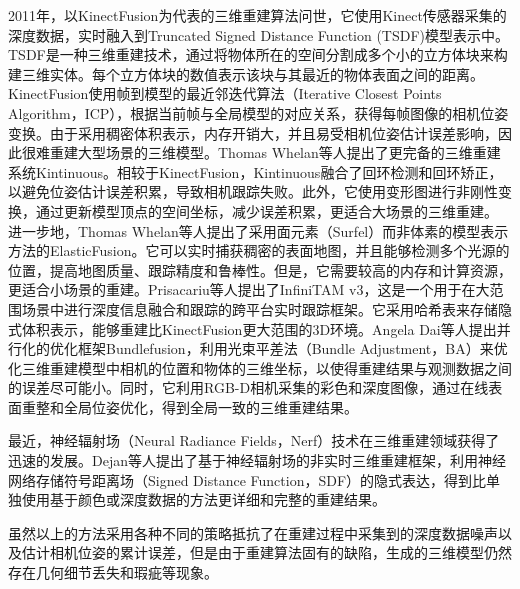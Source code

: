2011年，以KinectFusion为代表的三维重建算法问世，它使用Kinect传感器采集的深度数据，实时融入到Truncated Signed Distance Function (TSDF)模型表示中。TSDF是一种三维重建技术，通过将物体所在的空间分割成多个小的立方体块来构建三维实体。每个立方体块的数值表示该块与其最近的物体表面之间的距离。KinectFusion使用帧到模型的最近邻迭代算法（Iterative Closest Points Algorithm，ICP），根据当前帧与全局模型的对应关系，获得每帧图像的相机位姿变换。由于采用稠密体积表示，内存开销大，并且易受相机位姿估计误差影响，因此很难重建大型场景的三维模型。Thomas Whelan等人提出了更完备的三维重建系统Kintinuous。相较于KinectFusion，Kintinuous融合了回环检测和回环矫正，以避免位姿估计误差积累，导致相机跟踪失败。此外，它使用变形图进行非刚性变换，通过更新模型顶点的空间坐标，减少误差积累，更适合大场景的三维重建。
进一步地，Thomas Whelan等人提出了采用面元素（Surfel）而非体素的模型表示方法的ElasticFusion。它可以实时捕获稠密的表面地图，并且能够检测多个光源的位置，提高地图质量、跟踪精度和鲁棒性。但是，它需要较高的内存和计算资源，更适合小场景的重建。Prisacariu等人提出了InfiniTAM v3，这是一个用于在大范围场景中进行深度信息融合和跟踪的跨平台实时跟踪框架。它采用哈希表来存储隐式体积表示，能够重建比KinectFusion更大范围的3D环境。Angela Dai等人提出并行化的优化框架Bundlefusion，利用光束平差法（Bundle Adjustment，BA）来优化三维重建模型中相机的位置和物体的三维坐标，以使得重建结果与观测数据之间的误差尽可能小。同时，它利用RGB-D相机采集的彩色和深度图像，通过在线表面重整和全局位姿优化，得到全局一致的三维重建结果。

最近，神经辐射场（Neural Radiance Fields，Nerf）技术在三维重建领域获得了迅速的发展。Dejan等人提出了基于神经辐射场的非实时三维重建框架，利用神经网络存储符号距离场（Signed Distance Function，SDF）的隐式表达，得到比单独使用基于颜色或深度数据的方法更详细和完整的重建结果。\par

虽然以上的方法采用各种不同的策略抵抗了在重建过程中采集到的深度数据噪声以及估计相机位姿的累计误差，但是由于重建算法固有的缺陷，生成的三维模型仍然存在几何细节丢失和瑕疵等现象。

